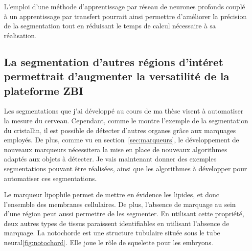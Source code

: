 \documentclass[\main/main.tex]{subfiles}
\begin{document}
L'emploi d'une méthode d'apprentissage par réseau de neurones profonds couplé à un apprentissage par transfert pourrait ainsi permettre d'améliorer la précision de la segmentation tout en réduisant le temps de calcul nécessaire à sa réalisation.

    \subsection{La segmentation d'autres régions d'intéret permettrait d'augmenter la versatilité de la plateforme ZBI}
 
%   
Les segmentations que j'ai développé au cours de ma thèse visent à automatiser la mesure du cerveau.
%
Cependant, comme le montre l'exemple de la segmentation du cristallin,
il est possible de détecter d'autres organes grâce aux marquages employés.
%
De plus, comme vu en section~\ref{sec:marqueurs}, le développement de nouveaux marqueurs nécessitera la mise en place de nouveaux algorithmes adaptés aux objets à détecter.
%
Je vais maintenant donner des exemples segmentations pouvant être réalisées, ainsi que les algorithmes à développer pour automatiser ces segmentations.

%
Le marqueur lipophile permet de mettre en évidence les lipides, et donc l'ensemble des membranes cellulaires. De plus, l'absence de marquage au sein d'une région peut aussi permettre de les segmenter.
%
En utilisant cette propriété, deux autres types de tissus paraissent identifiables en utilisant l'absence de marquage. La notochorde est une structure tubulaire située sous le tube neural\ref{fig:notochord}. Elle joue le rôle de squelette pour les embryons.

\end{document}
